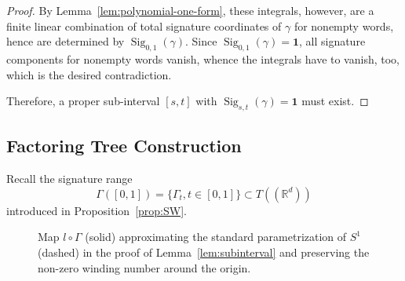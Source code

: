 \documentclass[10pt,a4paper]{amsart}
\newcommand{\R}{\mathbb{R}}
\newcommand{\Sig}{\operatorname{Sig}}
\newcommand{\id}{\mathbf{1}}
\begin{document}
\begin{proof}
By Lemma~\ref{lem:polynomial-one-form}, these integrals, however, are a finite linear combination of total signature coordinates of $\gamma$ for nonempty words, hence are determined by $\Sig_{0,1}(\gamma)$. Since $ \Sig_{0,1}(\gamma)=\id $, all signature components for nonempty words vanish, whence the integrals have to vanish, too, which is the desired contradiction.

Therefore, a proper sub-interval $ [s,t] $ with $ \Sig_{s,t}(\gamma)=\id $ must exist.
\end{proof}

\subsection*{Factoring Tree Construction}


Recall the signature range  
$$\Gamma([0,1]) = \{\Gamma_t, t\in [0,1]\} \subset T((\R^d))$$ introduced in Proposition~\ref{prop:SW}. 

\begin{figure}[t]
    \centering
    \caption{Map $l \circ \Gamma$ (solid) approximating the standard parametrization
    of $S^1$ (dashed) in the proof of Lemma~\ref{lem:subinterval} and preserving
    the non-zero winding number around the origin.}
    \label{fig:winding_approximation}
\end{figure}
\end{document}
